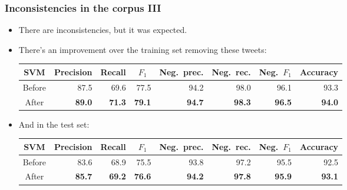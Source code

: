 \begin{frame}
    \frametitle{Inconsistencies in the corpus III}

    \begin{itemize}
        \item There are inconsistencies, but it was expected.
        \item There's an improvement over the training set removing these tweets:

        \begin{center}
            \scriptsize
            \begin{tabular}{ c r r r r r r r }
                \textbf{SVM} & \multicolumn{1}{c}{Precision} & \multicolumn{1}{c}{Recall} & \multicolumn{1}{c}{$F_1$} & \multicolumn{1}{c}{Neg.\ prec.} & \multicolumn{1}{c}{Neg.\ rec.} & \multicolumn{1}{c}{Neg.\ $F_1$} & \multicolumn{1}{c}{Accuracy} \\
                \midrule
                Before & 87.5 & 69.6 & 77.5 & 94.2 & 98.0 & 96.1 & 93.3 \\
                \midrule
                After & \textbf{89.0} & \textbf{71.3} & \textbf{79.1} & \textbf{94.7} & \textbf{98.3} & \textbf{96.5} & \textbf{94.0} \\
            \end{tabular}
        \end{center}
    \end{itemize}

    \begin{itemize}
        \item And in the test set:

        \begin{center}
            \scriptsize
            \begin{tabular}{ c r r r r r r r }
                \textbf{SVM} & \multicolumn{1}{c}{Precision} & \multicolumn{1}{c}{Recall} & \multicolumn{1}{c}{$F_1$} & \multicolumn{1}{c}{Neg.\ prec.} & \multicolumn{1}{c}{Neg.\ rec.} & \multicolumn{1}{c}{Neg.\ $F_1$} & \multicolumn{1}{c}{Accuracy} \\
                \midrule
                Before & 83.6 & 68.9 & 75.5 & 93.8 & 97.2 & 95.5 & 92.5 \\
                \midrule
                After & \textbf{85.7} & \textbf{69.2} & \textbf{76.6} & \textbf{94.2} & \textbf{97.8} & \textbf{95.9} & \textbf{93.1} \\
            \end{tabular}
        \end{center}
    \end{itemize}
\end{frame}

